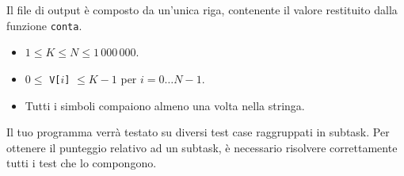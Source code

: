 Il file di output è composto da un'unica riga, contenente il valore restituito
dalla funzione \texttt{conta}.



\Constraints

\begin{itemize}[nolistsep, itemsep=2mm]
    \item $1 \le K \le N \le 1\,000\,000$.
    \item $0 \le$ \texttt{V[$i$]} $\le K-1$ per $i = 0\dots N-1$.
    \item Tutti i simboli compaiono almeno una volta nella stringa.
\end{itemize}



\Scoring

Il tuo programma verrà testato su diversi test case raggruppati in subtask.
Per ottenere il punteggio relativo ad un subtask, è necessario risolvere correttamente tutti i test che lo compongono.

